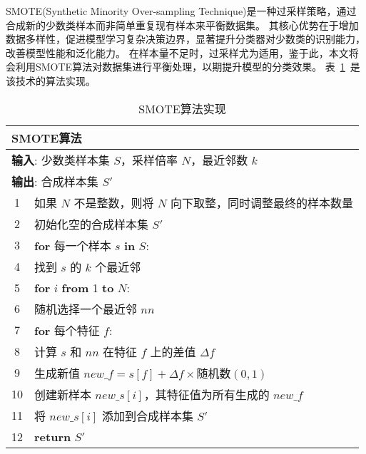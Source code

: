 SMOTE(Synthetic Minority Over-sampling Technique)是一种过采样策略，通过合成新的少数类样本而非简单重复现有样本来平衡数据集。
其核心优势在于增加数据多样性，促进模型学习复杂决策边界，显著提升分类器对少数类的识别能力，改善模型性能和泛化能力。
在样本量不足时，过采样尤为适用，鉴于此，本文将会利用SMOTE算法对数据集进行平衡处理，以期提升模型的分类效果。
表~\ref{tab:smote}~是该技术的算法实现。
\begin{table}[htbp]
	\caption{SMOTE算法实现}
	\label{tab:smote}
	\centering
	\begin{tabularx}{1.0\textwidth}{cl}
		\toprule
		\multicolumn{2}{l}{\textbf{SMOTE算法}}                                         \\
		\midrule
		\multicolumn{2}{l}{\textbf{输入}: 少数类样本集 $S$，采样倍率 $N$，最近邻数 $k$}                \\
		\multicolumn{2}{l}{\textbf{输出}: 合成样本集 $S'$}                                  \\
		1  & 如果 $N$ 不是整数，则将 $N$ 向下取整，同时调整最终的样本数量                                     \\
		2  & 初始化空的合成样本集 $S'$                                                         \\
		3  & \textbf{for} 每一个样本 $s$ \textbf{in} $S$:                                 \\
		4  & \quad 找到 $s$ 的 $k$ 个最近邻                                                 \\
		5  & \quad \textbf{for} $i$ \textbf{from} 1 \textbf{to} $N$:                 \\
		6  & \quad\quad 随机选择一个最近邻 $nn$                                               \\
		7  & \quad\quad \textbf{for} 每个特征 $f$:                                       \\
		8  & \quad\quad\quad 计算 $s$ 和 $nn$ 在特征 $f$ 上的差值 $\Delta f$                   \\
		9  & \quad\quad\quad 生成新值 $new\_f = s[f] + \Delta f \times \text{随机数}(0, 1)$ \\
		10 & \quad\quad 创建新样本 $new\_s[i]$，其特征值为所有生成的 $new\_f$                        \\
		11 & \quad\quad 将 $new\_s[i]$ 添加到合成样本集 $S'$                                  \\
		12 & \textbf{return} $S'$                                                    \\
		\bottomrule
	\end{tabularx}
\end{table}
